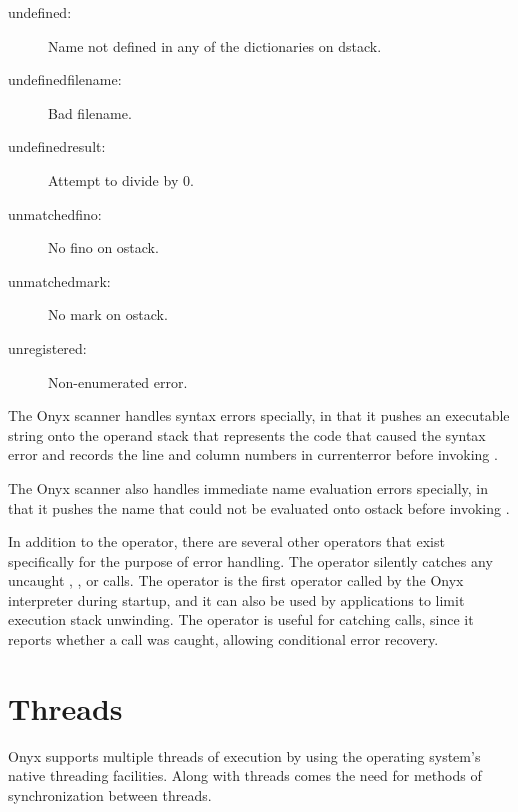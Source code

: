 \begin{description}
\label{undefined}
\item[undefined: ] Name not defined in any of the dictionaries on dstack.
\label{undefinedfilename}
\item[undefinedfilename: ] Bad filename.
\label{undefinedresult}
\item[undefinedresult: ] Attempt to divide by 0.
\label{unmatchedfino}
\item[unmatchedfino: ] No fino on ostack.
\label{unmatchedmark}
\item[unmatchedmark: ] No mark on ostack.
\label{unregistered}
\item[unregistered: ] Non-enumerated error.
\end{description}

The Onyx scanner handles syntax errors specially, in that it pushes an
executable string onto the operand stack that represents the code that caused
the syntax error and records the line and column numbers in currenterror before
invoking .

The Onyx scanner also handles immediate name evaluation errors specially, in
that it pushes the name that could not be evaluated onto ostack before invoking
.

In addition to the  operator,
there are several other operators that exist specifically for the purpose of
error handling.  The  operator
silently catches any uncaught ,
, or
 calls.  The 
operator is the first operator called by the Onyx interpreter during startup,
and it can also be used by applications to limit execution stack unwinding.  The
 operator is useful for
catching  calls, since it reports
whether a  call was caught, allowing conditional error
recovery.

\section{Threads}

Onyx supports multiple threads of execution by using the operating system's
native threading facilities.  Along with threads comes the need for methods of
synchronization between threads.

